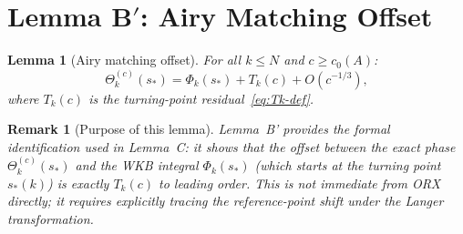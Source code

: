 \documentclass[12pt]{amsart}
\newtheorem{lemma}[theorem]{Lemma}
\newtheorem{remark}[theorem]{Remark}
\begin{document}
\section{Lemma B\texorpdfstring{$'$}{'}: Airy Matching Offset}
\label{sec:lemmaBp}

\begin{lemma}[Airy matching offset]
\label{lem:Bp}
For all $k \le N$ and $c \ge c_0(A)$:
\begin{equation}\label{eq:Airy-offset}
  \Theta_k^{(c)}(s_*)
  = \Phi_k(s_*) + T_k(c) + O(c^{-1/3}),
\end{equation}
where $T_k(c)$ is the turning-point residual~\eqref{eq:Tk-def}.
\end{lemma}

\begin{remark}[Purpose of this lemma]
Lemma~B' provides the formal identification used in Lemma~C:
it shows that the offset between the exact phase $\Theta_k^{(c)}(s_*)$
and the WKB integral $\Phi_k(s_*)$ (which starts at the turning
point $s_*(k)$) is \emph{exactly} $T_k(c)$ to leading order.
This is not immediate from ORX directly;
it requires explicitly tracing the reference-point shift
under the Langer transformation.
\end{remark}
\end{document}
